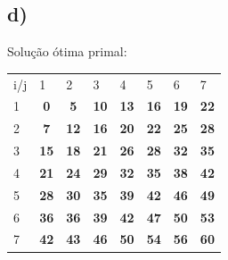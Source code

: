 \documentclass[11pt]{article} %
\begin{document}
\subsection*{d)}
Solução ótima primal:

\begin{table}[h]
\centering
\begin{tabular}{lccccccc}
i/j                    & \multicolumn{1}{l}{1}            & \multicolumn{1}{l}{2}            & \multicolumn{1}{l}{3}            & \multicolumn{1}{l}{4}            & \multicolumn{1}{l}{5}            & \multicolumn{1}{l}{6}            & \multicolumn{1}{l}{7}            \\ \cline{2-8} 
\multicolumn{1}{l|}{1} & \multicolumn{1}{c|}{\textbf{0}}  & \multicolumn{1}{c|}{\textbf{5}}  & \multicolumn{1}{c|}{\textbf{10}} & \multicolumn{1}{c|}{\textbf{13}} & \multicolumn{1}{c|}{\textbf{16}} & \multicolumn{1}{c|}{\textbf{19}} & \multicolumn{1}{c|}{\textbf{22}} \\ \cline{2-8} 
\multicolumn{1}{l|}{2} & \multicolumn{1}{c|}{\textbf{7}}  & \multicolumn{1}{c|}{\textbf{12}} & \multicolumn{1}{c|}{\textbf{16}} & \multicolumn{1}{c|}{\textbf{20}} & \multicolumn{1}{c|}{\textbf{22}} & \multicolumn{1}{c|}{\textbf{25}} & \multicolumn{1}{c|}{\textbf{28}} \\ \cline{2-8} 
\multicolumn{1}{l|}{3} & \multicolumn{1}{c|}{\textbf{15}} & \multicolumn{1}{c|}{\textbf{18}} & \multicolumn{1}{c|}{\textbf{21}} & \multicolumn{1}{c|}{\textbf{26}} & \multicolumn{1}{c|}{\textbf{28}} & \multicolumn{1}{c|}{\textbf{32}} & \multicolumn{1}{c|}{\textbf{35}} \\ \cline{2-8} 
\multicolumn{1}{l|}{4} & \multicolumn{1}{c|}{\textbf{21}} & \multicolumn{1}{c|}{\textbf{24}} & \multicolumn{1}{c|}{\textbf{29}} & \multicolumn{1}{c|}{\textbf{32}} & \multicolumn{1}{c|}{\textbf{35}} & \multicolumn{1}{c|}{\textbf{38}} & \multicolumn{1}{c|}{\textbf{42}} \\ \cline{2-8} 
\multicolumn{1}{l|}{5} & \multicolumn{1}{c|}{\textbf{28}} & \multicolumn{1}{c|}{\textbf{30}} & \multicolumn{1}{c|}{\textbf{35}} & \multicolumn{1}{c|}{\textbf{39}} & \multicolumn{1}{c|}{\textbf{42}} & \multicolumn{1}{c|}{\textbf{46}} & \multicolumn{1}{c|}{\textbf{49}} \\ \cline{2-8} 
\multicolumn{1}{l|}{6} & \multicolumn{1}{c|}{\textbf{36}} & \multicolumn{1}{c|}{\textbf{36}} & \multicolumn{1}{c|}{\textbf{39}} & \multicolumn{1}{c|}{\textbf{42}} & \multicolumn{1}{c|}{\textbf{47}} & \multicolumn{1}{c|}{\textbf{50}} & \multicolumn{1}{c|}{\textbf{53}} \\ \cline{2-8} 
\multicolumn{1}{l|}{7} & \multicolumn{1}{c|}{\textbf{42}} & \multicolumn{1}{c|}{\textbf{43}}  & \multicolumn{1}{c|}{\textbf{46}} & \multicolumn{1}{c|}{\textbf{50}} & \multicolumn{1}{c|}{\textbf{54}} & \multicolumn{1}{c|}{\textbf{56}} & \multicolumn{1}{c|}{\textbf{60}} \\ \cline{2-8} 
\end{tabular}
\end{table}
\end{document}

